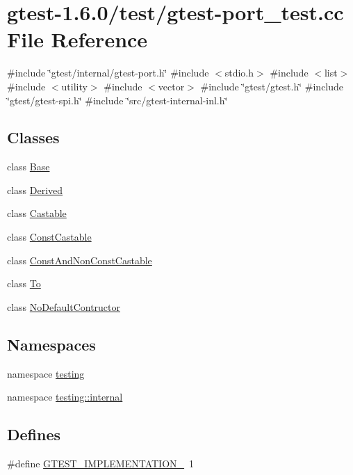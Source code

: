 \hypertarget{gtest-port__test_8cc}{\section{gtest-\/1.6.0/test/gtest-\/port\-\_\-test.cc \-File \-Reference}
\label{d1/df3/gtest-port__test_8cc}
}
{\ttfamily \#include \char`\"{}gtest/internal/gtest-\/port.\-h\char`\"{}}\*
{\ttfamily \#include $<$stdio.\-h$>$}\*
{\ttfamily \#include $<$list$>$}\*
{\ttfamily \#include $<$utility$>$}\*
{\ttfamily \#include $<$vector$>$}\*
{\ttfamily \#include \char`\"{}gtest/gtest.\-h\char`\"{}}\*
{\ttfamily \#include \char`\"{}gtest/gtest-\/spi.\-h\char`\"{}}\*
{\ttfamily \#include \char`\"{}src/gtest-\/internal-\/inl.\-h\char`\"{}}\*
\subsection*{\-Classes}
\begin{DoxyCompactItemize}
\item 
class \hyperlink{classtesting_1_1internal_1_1Base}{\-Base}
\item 
class \hyperlink{classtesting_1_1internal_1_1Derived}{\-Derived}
\item 
class \hyperlink{classtesting_1_1internal_1_1Castable}{\-Castable}
\item 
class \hyperlink{classtesting_1_1internal_1_1ConstCastable}{\-Const\-Castable}
\item 
class \hyperlink{classtesting_1_1internal_1_1ConstAndNonConstCastable}{\-Const\-And\-Non\-Const\-Castable}
\item 
class \hyperlink{classtesting_1_1internal_1_1To}{\-To}
\item 
class \hyperlink{classtesting_1_1internal_1_1NoDefaultContructor}{\-No\-Default\-Contructor}
\end{DoxyCompactItemize}
\subsection*{\-Namespaces}
\begin{DoxyCompactItemize}
\item 
namespace \hyperlink{namespacetesting}{testing}
\item 
namespace \hyperlink{namespacetesting_1_1internal}{testing\-::internal}
\end{DoxyCompactItemize}
\subsection*{\-Defines}
\begin{DoxyCompactItemize}
\item 
\#define \hyperlink{gtest-port__test_8cc_a83bd232fd1077579fada92c31bb7469f}{\-G\-T\-E\-S\-T\-\_\-\-I\-M\-P\-L\-E\-M\-E\-N\-T\-A\-T\-I\-O\-N\-\_\-}~1
\end{DoxyCompactItemize}
